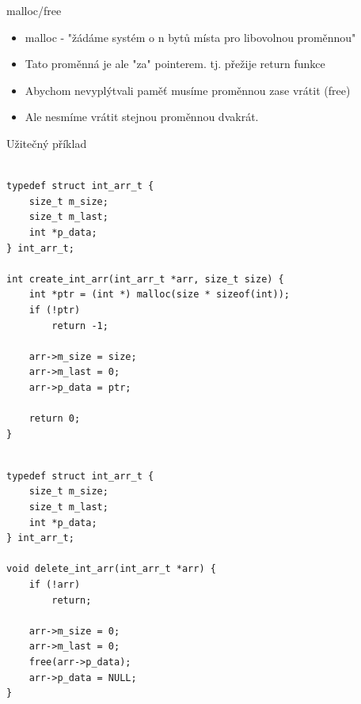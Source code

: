 \documentclass{beamer}
\begin{document}
\begin{frame}{malloc/free}

\begin{itemize}
    \item malloc - "žádáme systém o n bytů místa pro libovolnou proměnnou"
    \item Tato proměnná je ale "za" pointerem. tj. přežije return funkce
    \item Abychom nevyplýtvali paměť musíme proměnnou zase vrátit (free)
    \item Ale nesmíme vrátit stejnou proměnnou dvakrát.
\end{itemize}

\end{frame}

\begin{frame}[fragile]{Užitečný příklad}

{\small
\begin{verbatim}

typedef struct int_arr_t {
    size_t m_size;
    size_t m_last;
    int *p_data;
} int_arr_t;

int create_int_arr(int_arr_t *arr, size_t size) {
    int *ptr = (int *) malloc(size * sizeof(int));
    if (!ptr)
        return -1;

    arr->m_size = size;
    arr->m_last = 0;
    arr->p_data = ptr;

    return 0;
}

\end{verbatim}
}
    
\end{frame}

\begin{frame}[fragile]{}

{\small
\begin{verbatim}

typedef struct int_arr_t {
    size_t m_size;
    size_t m_last;
    int *p_data;
} int_arr_t;

void delete_int_arr(int_arr_t *arr) {
    if (!arr)
        return;

    arr->m_size = 0;
    arr->m_last = 0;
    free(arr->p_data);
    arr->p_data = NULL;
}

\end{verbatim}

}

\end{frame}
\end{document}
